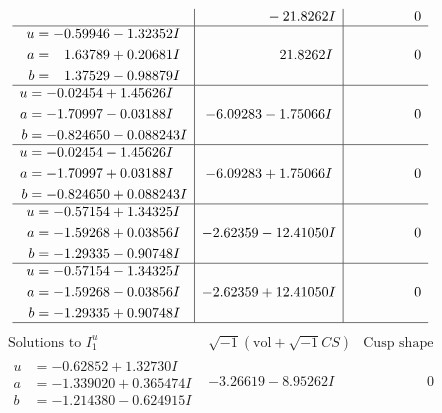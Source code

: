 \documentclass[1p]{elsarticle_modified}
\theoremstyle{definition}
\newcommand{\I}{\sqrt{-1}}
\begin{document}
$$\begin{array}{c|c|c}
 & \phantom{-0.000000 } -21.8262 I & \phantom{-0.000000 } 0 \\ \hline\begin{aligned}
u &= -0.59946 - 1.32352 I \\
a &= \phantom{-}1.63789 + 0.20681 I \\
b &= \phantom{-}1.37529 - 0.98879 I\end{aligned}
 & \phantom{-0.000000 -}21.8262 I & \phantom{-0.000000 } 0 \\ \hline\begin{aligned}
u &= -0.02454 + 1.45626 I \\
a &= -1.70997 - 0.03188 I \\
b &= -0.824650 - 0.088243 I\end{aligned}
 & -6.09283 - 1.75066 I & \phantom{-0.000000 } 0 \\ \hline\begin{aligned}
u &= -0.02454 - 1.45626 I \\
a &= -1.70997 + 0.03188 I \\
b &= -0.824650 + 0.088243 I\end{aligned}
 & -6.09283 + 1.75066 I & \phantom{-0.000000 } 0 \\ \hline\begin{aligned}
u &= -0.57154 + 1.34325 I \\
a &= -1.59268 + 0.03856 I \\
b &= -1.29335 - 0.90748 I\end{aligned}
 & -2.62359 - 12.41050 I & \phantom{-0.000000 } 0 \\ \hline\begin{aligned}
u &= -0.57154 - 1.34325 I \\
a &= -1.59268 - 0.03856 I \\
b &= -1.29335 + 0.90748 I\end{aligned}
 & -2.62359 + 12.41050 I & \phantom{-0.000000 } 0\\
 \hline 
 \end{array}$$\newpage$$\begin{array}{c|c|c}  
\text{Solutions to }I^u_{1}& \I (\text{vol} + \sqrt{-1}CS) & \text{Cusp shape}\\
 \hline 
\begin{aligned}
u &= -0.62852 + 1.32730 I \\
a &= -1.339020 + 0.365474 I \\
b &= -1.214380 - 0.624915 I\end{aligned}
 & -3.26619 - 8.95262 I & \phantom{-0.000000 } 0 \\ \hline\begin{aligned}

\end{aligned}
\end{array}$$
\end{document}
